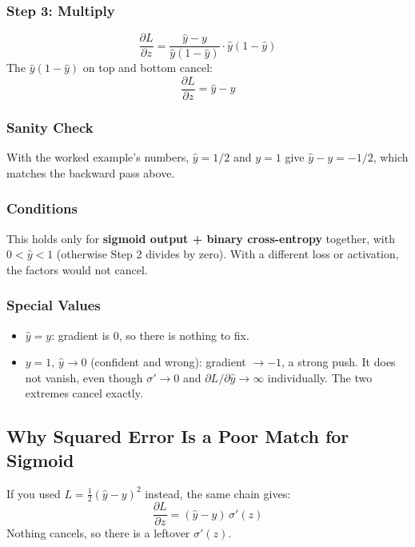 \subsubsection*{Step 3: Multiply}

\[
\frac{\partial L}{\partial z} = \frac{\hat{y} - y}{\hat{y}(1 - \hat{y})} \cdot \hat{y}(1 - \hat{y})
\]
The $\hat{y}(1 - \hat{y})$ on top and bottom cancel:
\[
\frac{\partial L}{\partial z} = \hat{y} - y
\]

\subsubsection*{Sanity Check}

With the worked example's numbers, $\hat{y} = 1/2$ and $y = 1$ give $\hat{y} - y = -1/2$, which matches the backward pass above.

\subsubsection*{Conditions}

This holds only for \textbf{sigmoid output + binary cross-entropy} together, with $0 < \hat{y} < 1$ (otherwise Step 2 divides by zero). With a different loss or activation, the factors would not cancel.

\subsubsection*{Special Values}

\begin{itemize}
  \item $\hat{y} = y$: gradient is 0, so there is nothing to fix.
  \item $y = 1$, $\hat{y} \to 0$ (confident and wrong): gradient $\to -1$, a strong push. It does not vanish, even though $\sigma' \to 0$ and $\partial L/\partial \hat{y} \to \infty$ individually. The two extremes cancel exactly.
\end{itemize}

\subsection*{Why Squared Error Is a Poor Match for Sigmoid}

If you used $L = \tfrac{1}{2}(\hat{y} - y)^2$ instead, the same chain gives:
\[
\frac{\partial L}{\partial z} = (\hat{y} - y)\,\sigma'(z)
\]
Nothing cancels, so there is a leftover $\sigma'(z)$.

